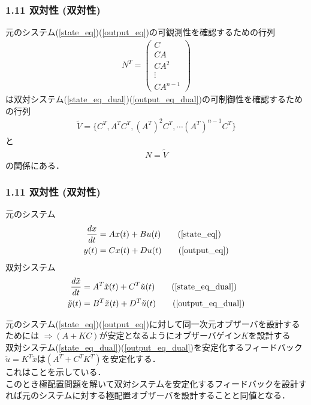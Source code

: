 \begin{frame}[t]
\frametitle{1.11 双対性 (双対性)}
元のシステム(\ref{state_eq})(\ref{output_eq})の可観測性を確認するための行列
\begin{align}
 N^T =
  \left( \begin{array}{c}
         C        \\
   C A      \\
   C A^2    \\
   \vdots   \\
   C A^{n-1}
  \end{array} \right)
\nonumber
\end{align}
は双対システム(\ref{state_eq_dual})(\ref{output_eq_dual})の可制御性を確認するための行列
\begin{align}
     \tilde{V} = \{C^T, A^T C^T, (A^T)^2 C^T , \cdots (A^T)^{n-1} C^T \}
\nonumber
\end{align}
と
\begin{align}
  N = \tilde{V}
\end{align}
の関係にある．

\end{frame}



\begin{frame}[t]
\frametitle{1.11 双対性 (双対性)}
元のシステム
\begin{align}
 \frac{dx}{dt} &= A x(t) + B u(t) \tag{\ref{state_eq}} \\
 y(t) &= C x(t) + D u(t) \tag{\ref{output_eq}}
\end{align}
双対システム
\begin{align}
 \frac{d \tilde{x}}{dt} &= A^T \tilde{x}(t) + C^T \tilde{u}(t) \tag{\ref{state_eq_dual}} \\
 \tilde{y}(t) &= B^T \tilde{x}(t) + D^T \tilde{u}(t) \tag{\ref{output_eq_dual}}
\end{align}

元のシステム(\ref{state_eq})(\ref{output_eq})に対して同一次元オブザーバを設計する
ためには
$\Longrightarrow (A+KC)$が安定となるようにオブザーバゲイン$K$を設計する\\
双対システム(\ref{state_eq_dual})(\ref{output_eq_dual})を安定化するフィードバック$\tilde{u} =  K^T \tilde{x}$は$(A^T + C^T K^T)$を安定化する．\\
これはことを示している．\\
このとき極配置問題を解いて双対システムを安定化するフィードバックを設計すれば元のシステムに対する極配置オブザーバを設計することと同値となる．

\end{frame}


